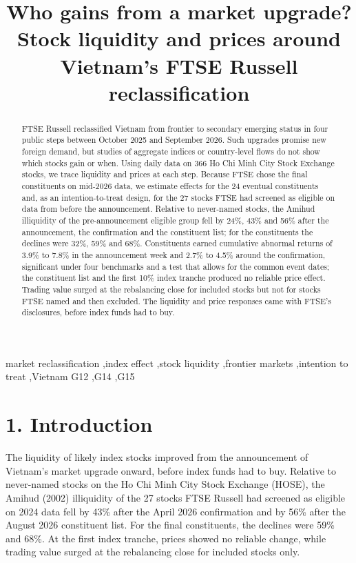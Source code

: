 \documentclass[review,authoryear,12pt]{elsarticle}
\begin{document}
\begin{frontmatter}
\title{Who gains from a market upgrade? Stock liquidity and prices around
Vietnam's FTSE Russell reclassification}
\begin{abstract}
FTSE Russell reclassified Vietnam from frontier to secondary emerging
status in four public steps between October 2025 and September 2026.
Such upgrades promise new foreign demand, but studies of aggregate
indices or country-level flows do not show which stocks gain or when.
Using daily data on 366 Ho Chi Minh City Stock Exchange stocks, we trace
liquidity and prices at each step. Because FTSE chose the final
constituents on mid-2026 data, we estimate effects for the 24 eventual
constituents and, as an intention-to-treat design, for the 27 stocks
FTSE had screened as eligible on data from before the announcement.
Relative to never-named stocks, the Amihud illiquidity of the
pre-announcement eligible group fell by 24\%, 43\% and 56\% after the
announcement, the confirmation and the constituent list; for the
constituents the declines were 32\%, 59\% and 68\%. Constituents earned
cumulative abnormal returns of 3.9\% to 7.8\% in the announcement week
and 2.7\% to 4.5\% around the confirmation, significant under four
benchmarks and a test that allows for the common event dates; the
constituent list and the first 10\% index tranche produced no reliable
price effect. Trading value surged at the rebalancing close for included
stocks but not for stocks FTSE named and then excluded. The liquidity
and price responses came with FTSE's disclosures, before index funds had
to buy.
\end{abstract}
\begin{keyword}
market reclassification \sep index effect \sep stock liquidity \sep frontier markets \sep intention to treat \sep Vietnam
\JEL G12 \sep G14 \sep G15
\end{keyword}
\end{frontmatter}
\doublespacing
\hypertarget{introduction}{%
\section*{1. Introduction}}

The liquidity of likely index stocks improved from the announcement of
Vietnam's market upgrade onward, before index funds had to buy. Relative
to never-named stocks on the Ho Chi Minh City Stock Exchange (HOSE), the
Amihud (2002) illiquidity of the 27 stocks FTSE Russell had screened as
eligible on 2024 data fell by 43\% after the April 2026 confirmation and
by 56\% after the August 2026 constituent list. For the final
constituents, the declines were 59\% and 68\%. At the first index
tranche, prices showed no reliable change, while trading value surged at
the rebalancing close for included stocks only.
\end{document}
